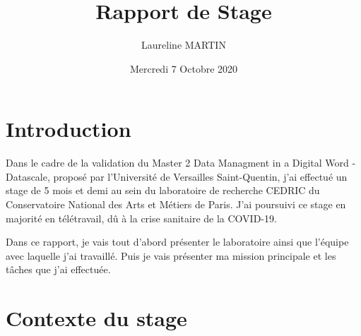 \documentclass{article}
\title{Rapport de Stage}
\author{Laureline MARTIN}
\date{Mercredi 7 Octobre 2020}
\begin{document}
\maketitle

\newpage
\renewcommand{\contentsname}{Table des matières}\tableofcontents

\newpage
\section{Introduction}
	Dans le cadre de la validation du Master 2 Data Managment in a Digital Word - Datascale, proposé par l'Université de Versailles Saint-Quentin, j'ai effectué un stage de 5 mois et demi au sein du laboratoire de recherche CEDRIC du Conservatoire National des Arts et Métiers de Paris.
	J'ai poursuivi ce stage en majorité en télétravail, dû à la crise sanitaire de la COVID-19.\par
	Dans ce rapport, je vais tout d'abord présenter le laboratoire ainsi que l'équipe avec laquelle j'ai travaillé. Puis je vais présenter ma mission principale et les tâches que j'ai effectuée.

\section{Contexte du stage}
\end{document}
